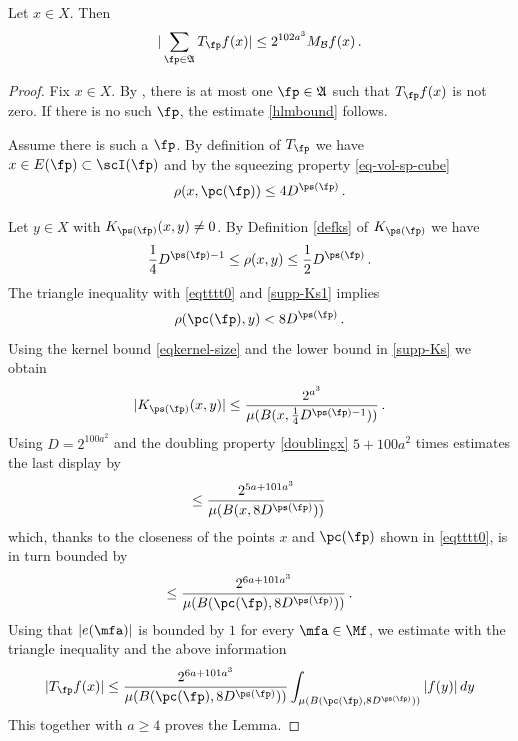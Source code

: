 \begin{lemma}
    \label{maximal-bound-antichain}
    \leanok
    Let $x\in X$.
    Then
    \begin{equation}\label{hlmbound}
    | \sum_{\fp \in \mathfrak{A}}T_{\fp} f(x)|\le 2^{102 a^3} M_{\mathcal{B}} f (x) \, .
    \end{equation}
\end{lemma}

\begin{proof}
\leanok
Fix $x\in X$. By , there is at most one $\fp \in \mathfrak{A}$
such that
 $T_{\fp} f(x)$ is not zero.
 If there is no such $\fp$, the estimate \eqref{hlmbound} follows.

 Assume there is such a $\fp$.
 By definition of $T_{\fp}$ we have $x\in E(\fp)\subset \scI(\fp)$ and by the squeezing property \eqref{eq-vol-sp-cube}
\begin{equation}\label{eqtttt0}
    \rho(x, \pc(\fp))\le 4D^{\ps(\fp)}\, .
\end{equation}

Let $y\in X$ with $K_{\ps(\fp)}(x,y)\neq 0$. By Definition \eqref{defks} of $K_{\ps(\fp)}$
we have
\begin{equation}\label{supp-Ks1}
   \frac{1}{4} D^{\ps(\fp)-1}
   \leq \rho(x,y) \leq \frac{1}{2} D^{\ps(\fp)}\, .
\end{equation}
The triangle inequality with \eqref{eqtttt0} and \eqref{supp-Ks1} implies
\begin{equation}
    \rho(\pc(\fp),y) < 8D^{\ps(\fp)}\, .
\end{equation}
Using the kernel bound \eqref{eqkernel-size} and the lower bound in \eqref{supp-Ks}
we obtain
\begin{equation}
|K_{\ps(\fp)}(x,y)|\le \frac{2^{a^3}}{\mu(B(x,\frac 14 D^{{\ps(\fp)}-1}))}\, .
\end{equation}
Using $D=2^{100a^2}$
and the doubling property \eqref{doublingx} $5 +100a^2$ times estimates
the last display by
\begin{equation}
\le \frac{2^{5a+101a^3}}{\mu(B(x, 8D^{\ps(\fp)}))}\,
\end{equation}
which, thanks to the closeness of the points $x$ and $\pc(\fp)$ shown in \eqref{eqtttt0}, is in turn bounded by
\begin{equation}
\le \frac{2^{6a+101a^3}}{\mu(B(\pc(\fp), 8D^{\ps(\fp)}))}\, .
\end{equation}
 Using that {$|e(\mfa)|$} is bounded by $1$
for every $\mfa\in \Mf$, we estimate with the triangle inequality and the above information
 \begin{equation}
  | T_{\fp} f(x)|
    \le \frac{2^{6a+101 a^3}}{\mu(B(\pc(\fp), 8D^{\ps(\fp)}))} \int _{\mu(B(\pc(\fp), 8D^{\ps(\fp)}))} |f(y)|\, dy
  \end{equation}
This together with $a\ge 4$ proves the Lemma.
\end{proof}


